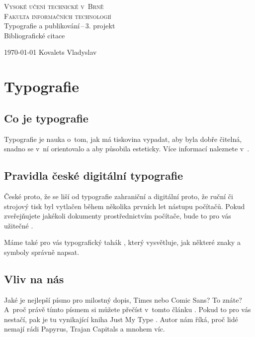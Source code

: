 \documentclass[a4paper, 11pt]{article}
\begin{document}
\begin{titlepage}
\begin{center}

\Huge \textsc{Vysoké učení technické v~Brně}\\
\huge\textsc{Fakulta informačních technologií} \\
\LARGE Typografie a publikování\,--\,3. projekt \\
\Huge {Bibliografické citace} \\

\end{center}

{\Large\today \hfill
Kovalets Vladyslav}

\end{titlepage}

\newpage

\section{Typografie}

\subsection{Co je typografie}

Typografie je nauka o~tom, jak má tiskovina vypadat, aby byla dobře čitelná, snadno se v~ní orientovalo a aby působila esteticky. Více informací naleznete v~\cite{Hrones2016}.

\subsection{Pravidla české digitální typografie}
České proto, že se liší od typografie zahraniční a digitální proto, že  ruční či strojový tisk byl vytlačen během několika prvních let nástupu počítačů. Pokud zveřejňujete jakékoli dokumenty prostřednictvím počítače, bude to pro vás užitečné \cite{Sirucek2007}.


Máme také pro vás typografický tahák \cite{Valkova2020}, který vysvětluje, jak některé znaky a symboly správně napsat.

\subsection{Vliv na nás}

Jaké je nejlepší písmo pro milostný dopis, Times nebo Comic Sans? To znáte? A~proč právě tímto písmem si můžete přečíst v~tomto článku \cite{Pilka2019}.
Pokud to pro vás nestačí, pak je tu vynikající kniha Just My Type \cite{Garfield2010}. Autor nám říká, proč lidé nemají rádi Papyrus, Trajan Capitals a mnohem víc.
\end{document}
